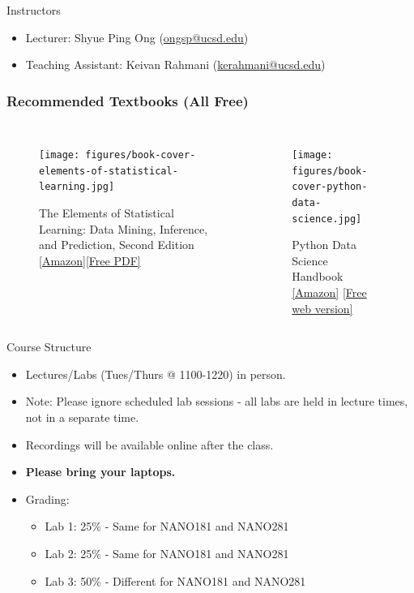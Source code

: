 \documentclass[aspectratio=169]{beamer}
\begin{document}
\begin{frame}{Instructors}
    \begin{itemize}
        \item Lecturer: Shyue Ping Ong (\href{mailto:ongsp@ucsd.edu}{ongsp@ucsd.edu})
        \item Teaching Assistant: Keivan Rahmani (\href{mailto:kerahmani@ucsd.edu}{kerahmani@ucsd.edu})
    \end{itemize}
\end{frame}


\begin{frame}
\frametitle{Recommended Textbooks (All Free)}

\begin{columns}
\begin{figure}
    \centering
    \texttt{[image: figures/book-cover-elements-of-statistical-learning.jpg]}
    \caption{The Elements of Statistical Learning: Data Mining, Inference, and Prediction, Second Edition  \href{http://www.amazon.com/dp/0387848576/ref=cm_sw_em_r_mt_dp_U_LTvbEbPHKK8VF}{[Amazon]}\href{http://web.stanford.edu/~hastie/ElemStatLearn/}{[Free PDF]}}
\end{figure}
\begin{figure}
    \centering
    \texttt{[image: figures/book-cover-python-data-science.jpg]}
    \caption{Python Data Science Handbook
        \href{https://www.amazon.com/dp/1491912057/ref=cm_sw_em_r_mt_dp_U_g0vbEb9N7HVQD}{[Amazon]} \href{http://jakevdp.github.io/PythonDataScienceHandbook/}{[Free web version]}}
\end{figure}
\end{columns}
\end{frame}


\begin{frame}{Course Structure}
    \begin{itemize}
        \item Lectures/Labs (Tues/Thurs @ 1100-1220) in person.
        \item Note: Please ignore scheduled lab sessions - all labs are held in lecture times, not in a separate time.
        \item Recordings will be available online after the class.
        \item \textbf{Please bring your laptops.}
        \item Grading:
        \begin{itemize}
            \item Lab 1: 25\% - Same for NANO181 and NANO281
            \item Lab 2: 25\% - Same for NANO181 and NANO281
            \item Lab 3: 50\% - Different for NANO181 and NANO281
        \end{itemize}
    \end{itemize}
\end{frame}
\end{document}
